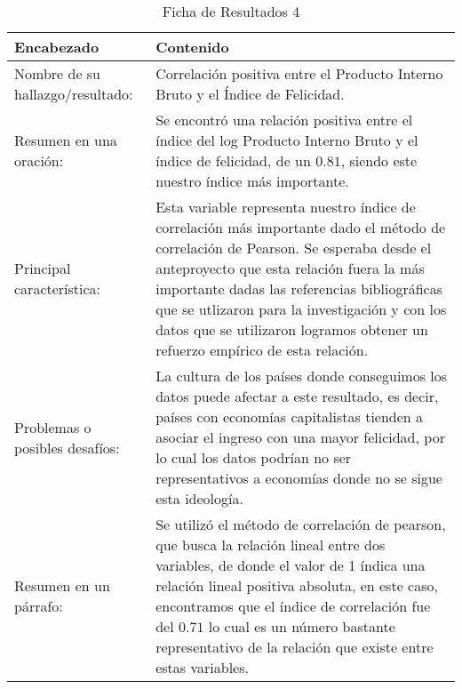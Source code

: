 \begin{table}[H]
    \caption{Ficha de Resultados 4}
    \begin{center}
        \begin{tabular}{  m{3cm} | m{12cm}  }
        \hline
        \textbf{ Encabezado} & \textbf{Contenido }\\ 
        \hline
        Nombre de su hallazgo/resultado: & Correlación positiva entre el Producto Interno Bruto y el Índice de Felicidad.\\ 
        \hline
        Resumen en una oración: & Se encontró una relación positiva entre el índice del log Producto Interno Bruto y el índice de felicidad, de un $0.81$, siendo este nuestro índice más importante.  \\ 
        \hline
        Principal característica: &  Esta variable representa nuestro índice de correlación más importante dado el método de correlación de Pearson. Se esperaba desde el anteproyecto que esta relación fuera la más importante dadas las referencias bibliográficas que se utlizaron para la investigación y con los datos que se utilizaron logramos obtener un refuerzo empírico de esta relación.\\ 
        \hline
        Problemas o posibles desafíos: & La cultura de los países donde conseguimos los datos puede afectar a este resultado, es decir, países con economías capitalistas tienden a asociar el ingreso con una mayor felicidad, por lo cual los datos podrían no ser representativos a economías donde no se sigue esta ideología. \\ \hline
        Resumen en un párrafo: & Se utilizó el método de correlación de pearson, que busca la relación lineal entre dos variables, de donde el valor de 1 índica una relación lineal positiva absoluta, en este caso, encontramos que el índice de correlación fue del $0.71$ lo cual es un número bastante representativo de la relación que existe entre estas variables. \\ 
        \hline
        \end{tabular}
    \end{center}
\end{table}


